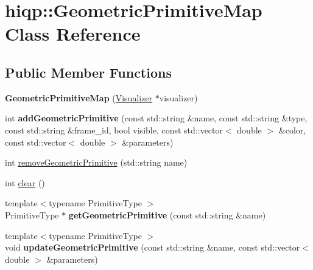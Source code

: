 \hypertarget{classhiqp_1_1GeometricPrimitiveMap}{\section{hiqp\-:\-:Geometric\-Primitive\-Map Class Reference}
\label{classhiqp_1_1GeometricPrimitiveMap}
}
\subsection*{Public Member Functions}
\begin{DoxyCompactItemize}
\item 
\hypertarget{classhiqp_1_1GeometricPrimitiveMap_a75f5875a1bc739dd4ba8481ba1223423}{{\bfseries Geometric\-Primitive\-Map} (\hyperlink{classhiqp_1_1Visualizer}{Visualizer} $\ast$visualizer)}\label{classhiqp_1_1GeometricPrimitiveMap_a75f5875a1bc739dd4ba8481ba1223423}

\item 
\hypertarget{classhiqp_1_1GeometricPrimitiveMap_a2bfb22cae11e12bed015448b35e44a47}{int {\bfseries add\-Geometric\-Primitive} (const std\-::string \&name, const std\-::string \&type, const std\-::string \&frame\-\_\-id, bool visible, const std\-::vector$<$ double $>$ \&color, const std\-::vector$<$ double $>$ \&parameters)}\label{classhiqp_1_1GeometricPrimitiveMap_a2bfb22cae11e12bed015448b35e44a47}

\item 
int \hyperlink{classhiqp_1_1GeometricPrimitiveMap_aaea2dfb16fe47d7ba1cb121819c58ffc}{remove\-Geometric\-Primitive} (std\-::string name)
\item 
int \hyperlink{classhiqp_1_1GeometricPrimitiveMap_a464de51eb9ee4644a59d27244ef19611}{clear} ()
\item 
\hypertarget{classhiqp_1_1GeometricPrimitiveMap_a2f03bb592134bfdbfa8c56862bf9adcd}{{\footnotesize template$<$typename Primitive\-Type $>$ }\\Primitive\-Type $\ast$ {\bfseries get\-Geometric\-Primitive} (const std\-::string \&name)}\label{classhiqp_1_1GeometricPrimitiveMap_a2f03bb592134bfdbfa8c56862bf9adcd}

\item 
\hypertarget{classhiqp_1_1GeometricPrimitiveMap_a9f1ee8a7975941d64b48298c125e28ec}{{\footnotesize template$<$typename Primitive\-Type $>$ }\\void {\bfseries update\-Geometric\-Primitive} (const std\-::string \&name, const std\-::vector$<$ double $>$ \&parameters)}\label{classhiqp_1_1GeometricPrimitiveMap_a9f1ee8a7975941d64b48298c125e28ec}


\end{DoxyCompactItemize}
